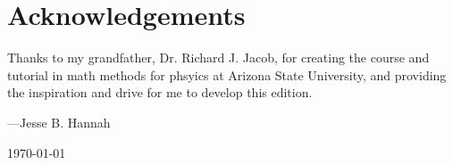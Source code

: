 \chapter{Acknowledgements}

Thanks to my grandfather, Dr. Richard J. Jacob, for creating the course and
tutorial in math methods for phsyics at Arizona State University, and providing
the inspiration and drive for me to develop this edition.

\begin{flushright}
---Jesse B. Hannah

\today
\end{flushright}
